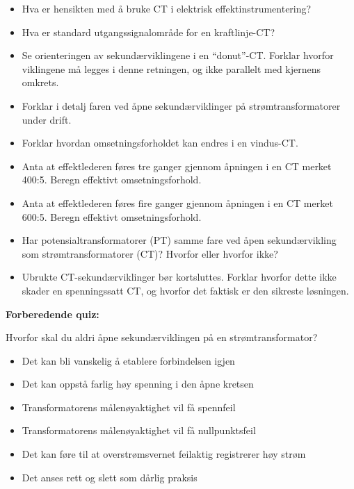 \begin{itemize}
\item{} Hva er hensikten med å bruke CT i elektrisk effektinstrumentering?
\item{} Hva er standard utgangssignalområde for en kraftlinje-CT?
\item{} Se orienteringen av sekundærviklingene i en ``donut''-CT. Forklar hvorfor viklingene må legges i denne retningen, og ikke parallelt med kjernens omkrets.
\item{} Forklar i detalj faren ved åpne sekundærviklinger på strømtransformatorer under drift.
\item{} Forklar hvordan omsetningsforholdet kan endres i en vindus-CT.
\item{} Anta at effektlederen føres tre ganger gjennom åpningen i en CT merket 400:5. Beregn effektivt omsetningsforhold.
\item{} Anta at effektlederen føres fire ganger gjennom åpningen i en CT merket 600:5. Beregn effektivt omsetningsforhold.
\item{} Har potensialtransformatorer (PT) samme fare ved åpen sekundærvikling som strømtransformatorer (CT)? Hvorfor eller hvorfor ikke?
\item{} Ubrukte CT-sekundærviklinger bør kortsluttes. Forklar hvorfor dette ikke skader en spenningssatt CT, og hvorfor det faktisk er den sikreste løsningen.
\end{itemize}










\vfil \eject

\noindent
{\bf Forberedende quiz:}

Hvorfor skal du aldri åpne sekundærviklingen på en strømtransformator?

\begin{itemize}
\item{} Det kan bli vanskelig å etablere forbindelsen igjen
\vskip 5pt 
\item{} Det kan oppstå farlig høy spenning i den åpne kretsen
\vskip 5pt 
\item{} Transformatorens målenøyaktighet vil få spennfeil
\vskip 5pt 
\item{} Transformatorens målenøyaktighet vil få nullpunktsfeil
\vskip 5pt 
\item{} Det kan føre til at overstrømsvernet feilaktig registrerer høy strøm
\vskip 5pt 
\item{} Det anses rett og slett som dårlig praksis
\end{itemize}




